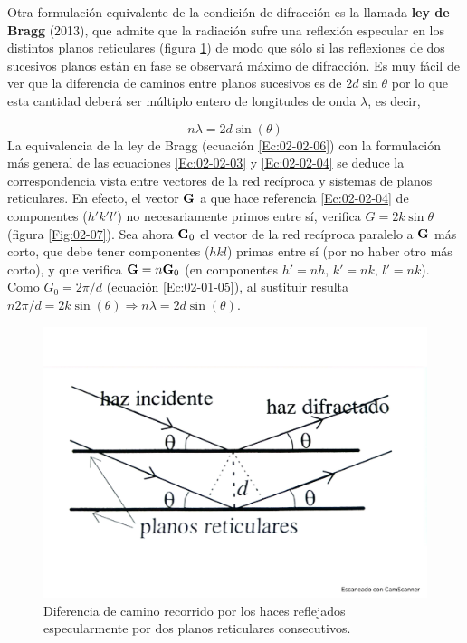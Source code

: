 Otra formulación equivalente de la condición de difracción es la llamada \textbf{ley de Bragg} (2013), que admite que la radiación sufre una reflexión especular en los distintos planos reticulares (figura \ref{Fig:02-06}) de modo que sólo si las reflexiones de dos sucesivos planos están en fase se observará máximo de difracción. Es muy fácil de ver que la diferencia de caminos entre planos sucesivos es de $2d\sin \theta$ por lo que esta cantidad deberá ser múltiplo entero de longitudes de onda $\lambda$, es decir,

\begin{equation}
    n \lambda = 2 d \sin (\theta) \label{Ec:02-02-06}
\end{equation}
La equivalencia de la ley de Bragg (ecuación \ref{Ec:02-02-06}) con la formulación más general de las ecuaciones \ref{Ec:02-02-03} y \ref{Ec:02-02-04} se deduce la correspondencia vista entre vectores de la red recíproca y sistemas de planos reticulares. En efecto, el vector $\mathbf{G}$ a que hace referencia \ref{Ec:02-02-04} de componentes ($h' k' l'$) no necesariamente primos entre sí, verifica $G=2k\sin \theta$ (figura \ref{Fig:02-07}). Sea ahora $\mathbf{G}_0$ el vector de la red recíproca paralelo a $\mathbf{G}$ más corto, que debe tener componentes ($hkl$) primas entre sí (por no haber otro más corto), y que verifica $\mathbf{G} = n \mathbf{G}_0$ (en componentes $h'=nh$, $k'=nk$, $l'=nk$). Como $G_0 = 2\pi/d$ (ecuación \ref{Ec:02-01-05}), al sustituir resulta $n2\pi/d=2k\sin (\theta) \Rightarrow n \lambda = 2 d \sin (\theta)$. 

\begin{figure}[h!] \centering
    \includegraphics[scale=0.35]{Cuerpo/Ch_02/Fotos_libro 6.pdf}
    \caption{Diferencia de camino recorrido por los haces reflejados especularmente por dos planos reticulares consecutivos.}
    \label{Fig:02-06}
\end{figure}
    
